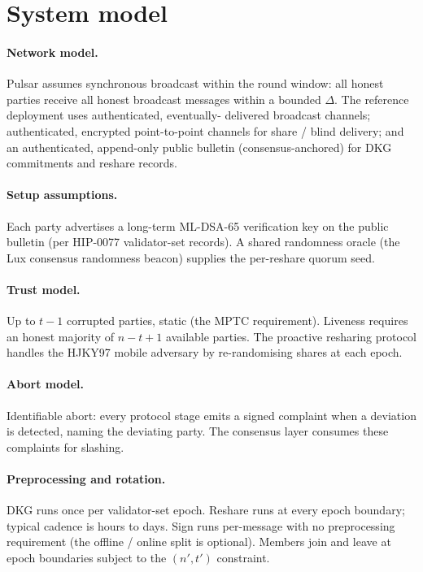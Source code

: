 
\section*{System model}

\paragraph{Network model.}
Pulsar assumes synchronous broadcast within the round window: all
honest parties receive all honest broadcast messages within a bounded
$\Delta$. The reference deployment uses authenticated, eventually-
delivered broadcast channels; authenticated, encrypted point-to-point
channels for share / blind delivery; and an authenticated,
append-only public bulletin (consensus-anchored) for DKG commitments
and reshare records.

\paragraph{Setup assumptions.}
Each party advertises a long-term ML-DSA-65 verification key on the
public bulletin (per HIP-0077 validator-set records). A shared
randomness oracle (the Lux consensus randomness beacon) supplies
the per-reshare quorum seed.

\paragraph{Trust model.}
Up to $t-1$ corrupted parties, static (the MPTC requirement).
Liveness requires an honest majority of $n - t + 1$ available
parties. The proactive resharing protocol handles the HJKY97 mobile
adversary by re-randomising shares at each epoch.

\paragraph{Abort model.}
Identifiable abort: every protocol stage emits a signed complaint
when a deviation is detected, naming the deviating party. The
consensus layer consumes these complaints for slashing.

\paragraph{Preprocessing and rotation.}
DKG runs once per validator-set epoch. Reshare runs at every
epoch boundary; typical cadence is hours to days. Sign runs
per-message with no preprocessing requirement (the offline / online
split is optional). Members join and leave at epoch boundaries
subject to the $(n', t')$ constraint.

